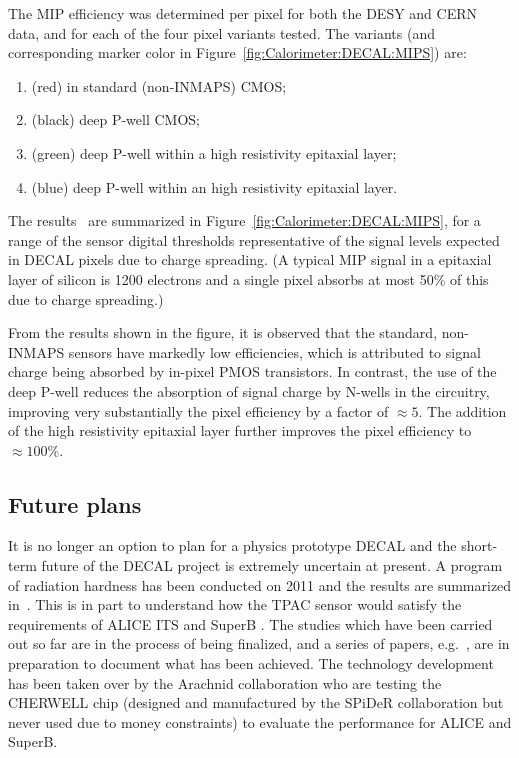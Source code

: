 The MIP efficiency was determined per pixel for both the DESY and CERN data, and for each of the four pixel variants tested. The variants (and corresponding marker color in Figure~\ref{fig:Calorimeter:DECAL:MIPS}) are:

\begin{enumerate}
\item (red) in \unit[12]{\micron} standard (non-INMAPS) CMOS;
\item (black) \unit[12]{\micron} deep P-well CMOS;
\item (green) deep P-well within a \unit[12]{\micron} high resistivity epitaxial layer;
\item (blue) deep P-well within an \unit[18]{\micron} high resistivity epitaxial layer.
\end{enumerate}

The results~\cite{Dauncey:2010zz} are summarized in Figure~\ref{fig:Calorimeter:DECAL:MIPS}, for a range of the sensor digital thresholds representative of the signal levels expected in DECAL pixels due to charge spreading. (A typical MIP signal in a \unit[12]{\micron} epitaxial layer of silicon is 1200 electrons and a single pixel absorbs at most 50\% of this due to charge spreading.)

From the results shown in the figure, it is observed that the standard, non-INMAPS sensors have markedly low efficiencies, which is attributed to signal charge being absorbed by in-pixel PMOS transistors. In contrast, the use of the deep P-well reduces the absorption of signal charge by N-wells in the circuitry, improving very substantially the pixel efficiency by a factor of $\approx 5$. The addition of the high resistivity epitaxial layer further improves the pixel efficiency to $\approx 100\%$.

\subsection{Future plans}
It is no longer an option to plan for a physics prototype DECAL and the short-term future of the DECAL project is extremely uncertain at present. A program of radiation hardness has been conducted on 2011 and the results are summarized in~\cite{Price:2012vta,Price:2013js}. This is in part to understand how the TPAC sensor would satisfy the requirements of ALICE ITS and SuperB . The studies which have been carried out so far are in the process of being finalized, and a series of papers, e.g.~\cite{Ballin:2011jq}, are in preparation to document what has been achieved. The technology development has been taken over by the Arachnid collaboration who are testing the CHERWELL chip (designed and manufactured by the SPiDeR collaboration but never used due to money constraints) to evaluate the performance for ALICE and SuperB.

